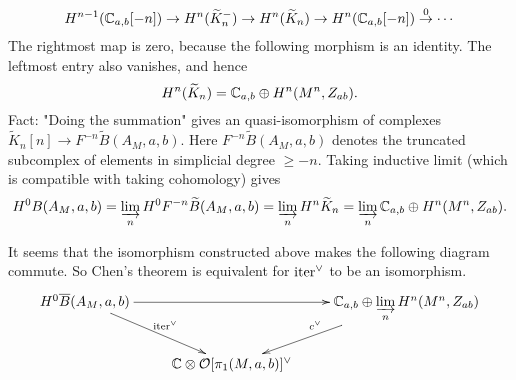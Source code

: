 \[
H^{n-1}(\mathbb{C}_{a,b}[-n]) \to H^n(\widetilde{K}_n^-) \to H^n(\widetilde{K}_n) \to H^n(\mathbb{C}_{a, b}[-n])  \stackrel{0}{\to} \cdots
\]
The rightmost map is zero, because the following morphism is an identity. 
The leftmost entry also vanishes, and hence
\[
H^n(\widetilde{K}_n) = \mathbb{C}_{a, b} \oplus H^n(M^n, Z_{ab}).
\]
Fact: "Doing the summation" gives an quasi-isomorphism of complexes $\widetilde{K}_n[n] \to F^{-n} \widetilde B (A_M,a,b)$. Here $F^{-n} \widetilde{B}(A_M,a,b)$ denotes the truncated subcomplex of elements in simplicial degree $\geq -n$.
Taking inductive limit (which is compatible with taking cohomology) gives
\[
    H^0 B(A_M,a,b) = \varinjlim_n H^0 F^{-n} \widetilde B(A_M,a,b) = \varinjlim_n  H^n \widetilde{K}_n =  \varinjlim_n \mathbb{C}_{a,b} \oplus H^n (M^n,Z_{ab}).
\] 

\begin{rem} It seems that the isomorphism constructed above makes the following diagram commute. 
So Chen's theorem is equivalent for $\mathrm{iter}^\vee$ to be an isomorphism.
\[
\begin{xy}
\xymatrix{
H^0\overline B(A_M,a,b) \ar[rd]^{\iter^\vee} \ar[rr] & & \C_{a,b} \oplus \varinjlim \limits_n H^n(M^n, Z_{ab}) \ar[ld]_{c^\vee} \\
& \C \otimes \cO [\pi_1(M,a,b)]^\vee 
}
\end{xy}
\]
\end{rem}
